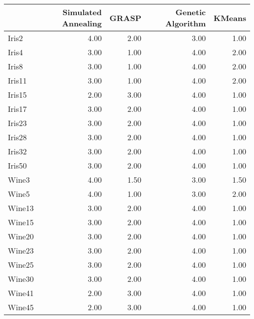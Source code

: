 \begin{table}
\centering
\label{tab:test_ranks}
\begin{tabular}{lrrrr}
\toprule
{} &  Simulated Annealing &  GRASP &  Genetic Algorithm &  KMeans \\
\midrule
Iris2      &                 4.00 &   2.00 &               3.00 &    1.00 \\
Iris4      &                 3.00 &   1.00 &               4.00 &    2.00 \\
Iris8      &                 3.00 &   1.00 &               4.00 &    2.00 \\
Iris11     &                 3.00 &   1.00 &               4.00 &    2.00 \\
Iris15     &                 2.00 &   3.00 &               4.00 &    1.00 \\
Iris17     &                 3.00 &   2.00 &               4.00 &    1.00 \\
Iris23     &                 3.00 &   2.00 &               4.00 &    1.00 \\
Iris28     &                 3.00 &   2.00 &               4.00 &    1.00 \\
Iris32     &                 3.00 &   2.00 &               4.00 &    1.00 \\
Iris50     &                 3.00 &   2.00 &               4.00 &    1.00 \\
Wine3      &                 4.00 &   1.50 &               3.00 &    1.50 \\
Wine5      &                 4.00 &   1.00 &               3.00 &    2.00 \\
Wine13     &                 3.00 &   2.00 &               4.00 &    1.00 \\
Wine15     &                 3.00 &   2.00 &               4.00 &    1.00 \\
Wine20     &                 3.00 &   2.00 &               4.00 &    1.00 \\
Wine23     &                 3.00 &   2.00 &               4.00 &    1.00 \\
Wine25     &                 3.00 &   2.00 &               4.00 &    1.00 \\
Wine30     &                 3.00 &   2.00 &               4.00 &    1.00 \\
Wine41     &                 2.00 &   3.00 &               4.00 &    1.00 \\
Wine45     &                 2.00 &   3.00 &               4.00 &    1.00 \\

\end{tabular}
\end{table}
